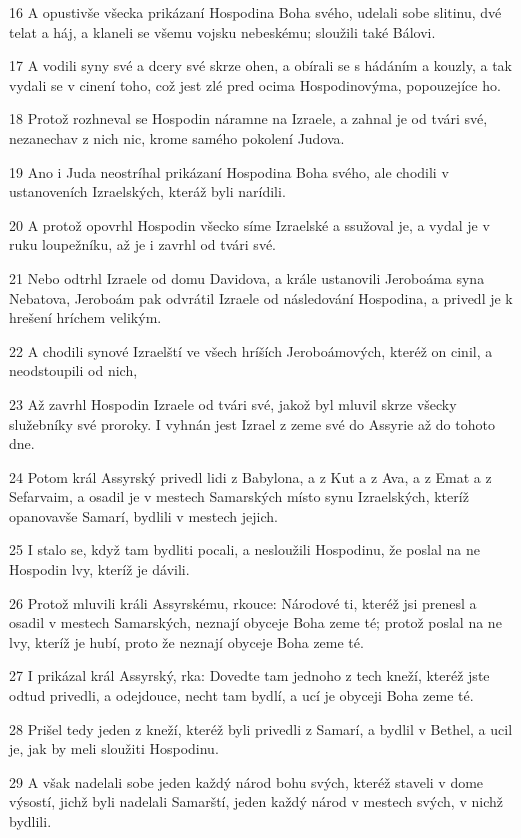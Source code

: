 \par 16 A opustivše všecka prikázaní Hospodina Boha svého, udelali sobe slitinu, dvé telat a háj, a klaneli se všemu vojsku nebeskému; sloužili také Bálovi.
\par 17 A vodili syny své a dcery své skrze ohen, a obírali se s hádáním a kouzly, a tak vydali se v cinení toho, což jest zlé pred ocima Hospodinovýma, popouzejíce ho.
\par 18 Protož rozhneval se Hospodin náramne na Izraele, a zahnal je od tvári své, nezanechav z nich nic, krome samého pokolení Judova.
\par 19 Ano i Juda neostríhal prikázaní Hospodina Boha svého, ale chodili v ustanoveních Izraelských, kteráž byli narídili.
\par 20 A protož opovrhl Hospodin všecko síme Izraelské a ssužoval je, a vydal je v ruku loupežníku, až je i zavrhl od tvári své.
\par 21 Nebo odtrhl Izraele od domu Davidova, a krále ustanovili Jeroboáma syna Nebatova, Jeroboám pak odvrátil Izraele od následování Hospodina, a privedl je k hrešení hríchem velikým.
\par 22 A chodili synové Izraelští ve všech hríších Jeroboámových, kteréž on cinil, a neodstoupili od nich,
\par 23 Až zavrhl Hospodin Izraele od tvári své, jakož byl mluvil skrze všecky služebníky své proroky. I vyhnán jest Izrael z zeme své do Assyrie až do tohoto dne.
\par 24 Potom král Assyrský privedl lidi z Babylona, a z Kut a z Ava, a z Emat a z Sefarvaim, a osadil je v mestech Samarských místo synu Izraelských, kteríž opanovavše Samarí, bydlili v mestech jejich.
\par 25 I stalo se, když tam bydliti pocali, a nesloužili Hospodinu, že poslal na ne Hospodin lvy, kteríž je dávili.
\par 26 Protož mluvili králi Assyrskému, rkouce: Národové ti, kteréž jsi prenesl a osadil v mestech Samarských, neznají obyceje Boha zeme té; protož poslal na ne lvy, kteríž je hubí, proto že neznají obyceje Boha zeme té.
\par 27 I prikázal král Assyrský, rka: Dovedte tam jednoho z tech kneží, kteréž jste odtud privedli, a odejdouce, necht tam bydlí, a ucí je obyceji Boha zeme té.
\par 28 Prišel tedy jeden z kneží, kteréž byli privedli z Samarí, a bydlil v Bethel, a ucil je, jak by meli sloužiti Hospodinu.
\par 29 A však nadelali sobe jeden každý národ bohu svých, kteréž staveli v dome výsostí, jichž byli nadelali Samarští, jeden každý národ v mestech svých, v nichž bydlili.
